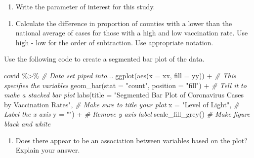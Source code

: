 \documentclass[
]{report}
\newenvironment{Shaded}{\begin{snugshade}}{\end{snugshade}}
\newcommand{\AttributeTok}[1]{\textcolor[rgb]{0.77,0.63,0.00}{#1}}
\newcommand{\CommentTok}[1]{\textcolor[rgb]{0.56,0.35,0.01}{\textit{#1}}}
\newcommand{\FunctionTok}[1]{\textcolor[rgb]{0.00,0.00,0.00}{#1}}
\newcommand{\NormalTok}[1]{#1}
\newcommand{\SpecialCharTok}[1]{\textcolor[rgb]{0.00,0.00,0.00}{#1}}
\newcommand{\StringTok}[1]{\textcolor[rgb]{0.31,0.60,0.02}{#1}}
\providecommand{\tightlist}{%
  \setlength{\itemsep}{0pt}\setlength{\parskip}{0pt}}
\begin{document}
\begin{enumerate}
\def\labelenumi{\arabic{enumi}.}
\setcounter{enumi}{3}
\tightlist
\item
  Write the parameter of interest for this study.
\end{enumerate}

\vspace{1in}

\begin{enumerate}
\def\labelenumi{\arabic{enumi}.}
\setcounter{enumi}{4}
\tightlist
\item
  Calculate the difference in proportion of counties with a lower than the national average of cases for those with a high and low vaccination rate. Use high - low for the order of subtraction. Use appropriate notation.
\end{enumerate}

\vspace{0.8in}

Use the following code to create a segmented bar plot of the data.

\begin{Shaded}
\begin{Highlighting}[]
\NormalTok{covid }\SpecialCharTok{\%\textgreater{}\%} \CommentTok{\# Data set piped into...}
\FunctionTok{ggplot}\NormalTok{(}\FunctionTok{aes}\NormalTok{(}\AttributeTok{x =}\NormalTok{ xx, }\AttributeTok{fill =}\NormalTok{ yy)) }\SpecialCharTok{+}   \CommentTok{\# This specifies the variables}
  \FunctionTok{geom\_bar}\NormalTok{(}\AttributeTok{stat =} \StringTok{"count"}\NormalTok{, }\AttributeTok{position =} \StringTok{"fill"}\NormalTok{) }\SpecialCharTok{+}  \CommentTok{\# Tell it to make a stacked bar plot}
  \FunctionTok{labs}\NormalTok{(}\AttributeTok{title =} \StringTok{"Segmented Bar Plot of Coronavirus Cases by Vaccination Rates"}\NormalTok{,  }
       \CommentTok{\# Make sure to title your plot }
       \AttributeTok{x =} \StringTok{"Level of Light"}\NormalTok{,   }\CommentTok{\# Label the x axis}
       \AttributeTok{y =} \StringTok{""}\NormalTok{) }\SpecialCharTok{+}  \CommentTok{\# Remove y axis label}
    \FunctionTok{scale\_fill\_grey}\NormalTok{()  }\CommentTok{\# Make figure black and white}
\end{Highlighting}
\end{Shaded}

\begin{enumerate}
\def\labelenumi{\arabic{enumi}.}
\setcounter{enumi}{5}
\tightlist
\item
  Does there appear to be an association between variables based on the plot? Explain your answer.
\end{enumerate}
\end{document}
